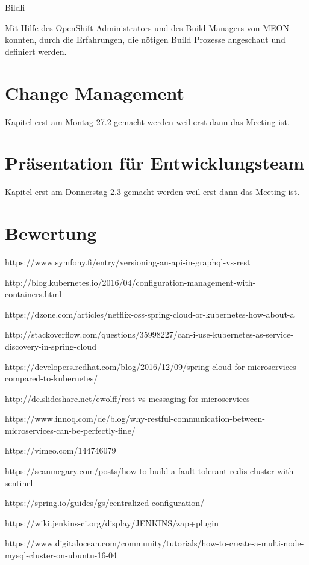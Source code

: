 {\color{red} Bildli}

Mit Hilfe des OpenShift Administrators und des Build Managers von MEON konnten, durch die Erfahrungen, die nötigen Build Prozesse angeschaut und definiert werden.

\section{Change Management}

{\color{red} Kapitel erst am Montag 27.2 gemacht werden weil erst dann das Meeting ist.}

\section{Präsentation für Entwicklungsteam}

{\color{red} Kapitel erst am Donnerstag 2.3 gemacht werden weil erst dann das Meeting ist.}

\section{Bewertung}

https://www.symfony.fi/entry/versioning-an-api-in-graphql-vs-rest

http://blog.kubernetes.io/2016/04/configuration-management-with-containers.html

https://dzone.com/articles/netflix-oss-spring-cloud-or-kubernetes-how-about-a

http://stackoverflow.com/questions/35998227/can-i-use-kubernetes-as-service-discovery-in-spring-cloud

https://developers.redhat.com/blog/2016/12/09/spring-cloud-for-microservices-compared-to-kubernetes/

http://de.slideshare.net/ewolff/rest-vs-messaging-for-microservices

https://www.innoq.com/de/blog/why-restful-communication-between-microservices-can-be-perfectly-fine/

https://vimeo.com/144746079

https://seanmcgary.com/posts/how-to-build-a-fault-tolerant-redis-cluster-with-sentinel

https://spring.io/guides/gs/centralized-configuration/

https://wiki.jenkins-ci.org/display/JENKINS/zap+plugin

https://www.digitalocean.com/community/tutorials/how-to-create-a-multi-node-mysql-cluster-on-ubuntu-16-04

